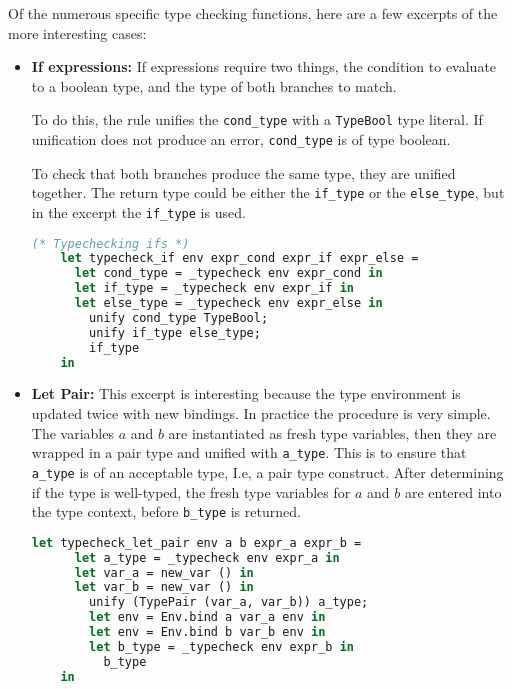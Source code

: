 \documentclass{l4proj}
\begin{document}
Of the numerous specific type checking functions, here are a few excerpts of the more interesting cases:
\begin{itemize}
    \item \textbf{If expressions:}
If expressions require two things, the condition to evaluate to a boolean type, and the type of both branches to match.

To do this, the rule unifies the \texttt{cond\_type} with a \texttt{TypeBool} type literal.
If unification does not produce an error, \texttt{cond\_type} is of type boolean.

To check that both branches produce the same type, they are unified together.
The return type could be either the \texttt{if\_type} or the \texttt{else\_type}, but in the excerpt the \texttt{if\_type} is used.
\begin{lstlisting}[language=Caml, caption=PyFunc Typechecker's typecheck\_if function. If no error is produced then the provided if-expression code is well-typed.]
    (* Typechecking ifs *)
    let typecheck_if env expr_cond expr_if expr_else = 
      let cond_type = _typecheck env expr_cond in
      let if_type = _typecheck env expr_if in 
      let else_type = _typecheck env expr_else in
        unify cond_type TypeBool;
        unify if_type else_type;
        if_type
    in
\end{lstlisting}



    \item \textbf{Let Pair:}
    This excerpt is interesting because the type environment is updated twice with new bindings.
    In practice the procedure is very simple.
    The variables $a$ and $b$ are instantiated as fresh type variables, then they are wrapped in a pair type and unified with \texttt{a\_type}.
    This is to ensure that \texttt{a\_type} is of an acceptable type, I.e, a pair type construct.
    After determining if the type is well-typed, the fresh type variables for $a$ and $b$ are entered into the type context, before \texttt{b\_type} is returned.
    \begin{lstlisting}[language=Caml, caption=PyFunc Typechecker's typecheck\_let\_pair function. If no error is produced then the provided let-pair code is well-typed.]
    let typecheck_let_pair env a b expr_a expr_b =
      let a_type = _typecheck env expr_a in
      let var_a = new_var () in
      let var_b = new_var () in
        unify (TypePair (var_a, var_b)) a_type;
        let env = Env.bind a var_a env in
        let env = Env.bind b var_b env in
        let b_type = _typecheck env expr_b in
          b_type
    in
    \end{lstlisting}




\end{itemize}
\end{document}
